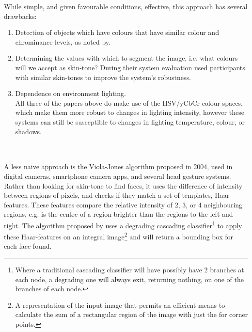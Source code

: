 While simple, and given favourable conditions, effective, this approach has several drawbacks:
\begin{enumerate}
    \item Detection of objects which have colours that have similar colour and chrominance levels, as noted by\citeauthor{bin2007rgb}\cite{bin2007rgb}.
    \item Determining the values with which to segment the image, i.e. what colours will we accept as skin-tone? During their system evaluation \citeauthor{chan2004face}\cite{chan2004face} used participants with similar skin-tones to improve the system's robustness.
    \item Dependence on environment lighting.\\
        All three of the papers above\cite{huang2004robust,bin2007rgb,chan2004face} do make use of the HSV/yCbCr colour spaces, which make them more robust to changes in lighting intensity, however these systems can still be susceptible to changes in lighting temperature, colour, or shadows.
\end{enumerate}
\\\\
A less naive approach is the Viola-Jones algorithm proposed in 2004\cite{viola2004robust}, used in digital cameras, smartphone camera apps, and several head gesture systems\cite{kim2017real, neto2012real, francone2011using}.
Rather than looking for skin-tone to find faces, it uses the difference of intensity between regions of pixels, and checks if they match a set of templates, Haar-features. These features compare the relative intensity of 2, 3, or 4 neighbouring regions, e.g. is the centre of a region brighter than the regions to the left and right. 
The algorithm proposed by \citeauthor{viola2004robust} uses a degrading cascading classifier\footnote{Where a traditional cascading classifier will have possibly have 2 branches at each node, a degrading one will always exit, returning nothing, on one of the branches of each node.} to apply these Haar-features on an integral image\footnote{A representation of the input image that permits an efficient means to calculate the sum of a rectangular region of the image with just the for corner points.} and will return a bounding box for each face found.

